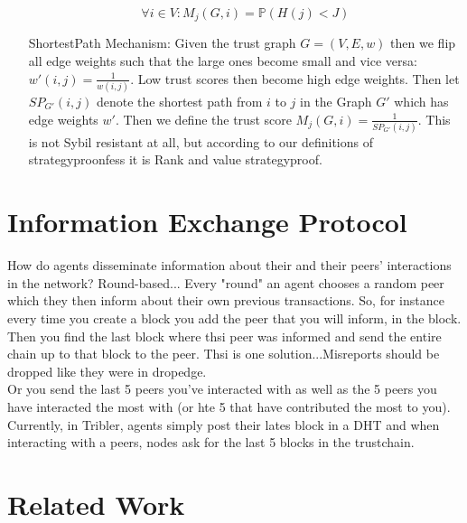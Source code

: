 \documentclass[11pt,a4paper]{report}
\theoremstyle{definition}
\theoremstyle{theorem}
\theoremstyle{proposition}
\theoremstyle{corollary}
\theoremstyle{lemma}
\theoremstyle{example}
\theoremstyle{remark}
\begin{document}
\begin{enumerate}
\[
\forall i\in{}V: M_j(G,i)=\mathbb{P}(H(j)<J)
\]
\item[ShortestPath Mechanism:] Given the trust graph $G=(V,E,w)$ then we flip all edge weights such that the large ones become small and vice versa: $w'(i,j)=\frac{1}{w(i,j)}$. Low trust scores then become high edge weights. Then let $SP_{G'}(i,j)$ denote the shortest path from $i$ to $j$ in the Graph $G'$ which has edge weights $w'$. Then we define the trust score $M_j(G,i)=\frac{1}{SP_{G'}(i,j)}$. This is not Sybil resistant at all, but according to our definitions of strategyproonfess it is Rank and value strategyproof.
\end{enumerate}


\section{Information Exchange Protocol}
\label{sec:Information Exchange Protocol}
How do agents disseminate information about their and their peers' interactions in the network? Round-based... Every "round" an agent chooses a random peer which they then inform about their own previous transactions. So, for instance every time you create a block you add the peer that you will inform, in the block. Then you find the last block where thsi peer was informed and send the entire chain up to that block to the peer. Thsi is one solution...Misreports should be dropped like they were in dropedge.\vspace{1em}\\

\noindent{} Or you send the last 5 peers you've interacted with as well as the 5 peers you have interacted the most with (or hte 5 that have contributed the most to you).\vspace{1em}\\

\noindent{} Currently, in Tribler, agents simply post their lates block in a DHT and when interacting with a peers, nodes ask for the last 5 blocks in the trustchain. 


\section{Related Work}
\label{sec:Related Work}
\end{document}
